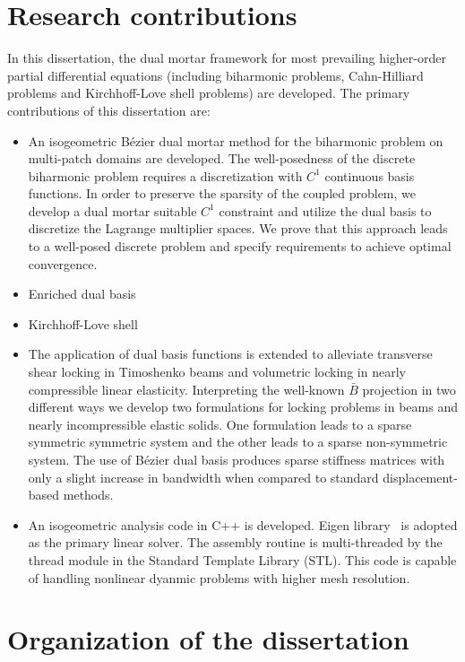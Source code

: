 \section{Research contributions}

In this dissertation, the dual mortar framework for most prevailing higher-order partial differential equations (including biharmonic problems, Cahn-Hilliard problems and Kirchhoff-Love shell problems) are developed. The primary contributions of this dissertation are:
\begin{itemize}
    \item An isogeometric B\'ezier dual mortar method for the biharmonic problem on multi-patch domains are developed. The well-posedness of the discrete biharmonic problem requires a discretization with $C^1$ continuous basis functions. In order to preserve the sparsity of the coupled problem, we develop a dual mortar suitable $C^1$ constraint and utilize the \Bezier dual basis to discretize the Lagrange multiplier spaces. We prove that this approach leads to a well-posed discrete problem and specify requirements to achieve optimal convergence. 
    \item Enriched dual basis
    \item Kirchhoff-Love shell
    \item The application of \Bezier dual basis functions is extended to alleviate transverse shear locking in Timoshenko beams and volumetric locking in nearly compressible linear elasticity. Interpreting the well-known $\bar{B}$ projection in two different ways we develop two formulations for locking problems in beams and nearly incompressible elastic solids.  One formulation leads to a sparse symmetric symmetric system and the other leads to a sparse non-symmetric system. The use of B\'ezier dual basis produces sparse stiffness matrices with only a slight increase in bandwidth when compared to standard displacement-based methods. 
    \item An isogeometric analysis code in C++ is developed. Eigen library~\cite{eigenweb} is adopted as the primary linear solver. The assembly routine is multi-threaded by the thread module in the Standard Template Library (STL). This code is capable of handling nonlinear dyanmic problems with higher mesh resolution. 
\end{itemize}

\section{Organization of the dissertation}
